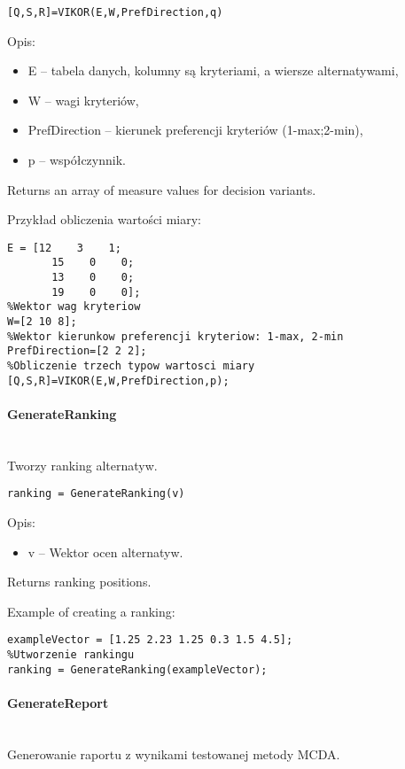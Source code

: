 \begin{lstlisting}[style=Matlab-editor]
[Q,S,R]=VIKOR(E,W,PrefDirection,q)
\end{lstlisting}

Opis:
\begin{itemize}
\item E -- tabela danych, kolumny są kryteriami, a wiersze alternatywami,
\item W -- wagi kryteriów,
\item PrefDirection -- kierunek preferencji kryteriów (1-max;2-min),
\item p -- współczynnik.
\end{itemize}

Returns an array of measure values for decision variants.

Przykład obliczenia wartości miary:
\begin{lstlisting}[style=Matlab-editor]
%Tablica danych
E = [12    3    1;
       15    0    0;
       13    0    0;
       19    0    0];
%Wektor wag kryteriow
W=[2 10 8];
%Wektor kierunkow preferencji kryteriow: 1-max, 2-min
PrefDirection=[2 2 2];
%Obliczenie trzech typow wartosci miary
[Q,S,R]=VIKOR(E,W,PrefDirection,p);
\end{lstlisting}


\paragraph{GenerateRanking} \hspace{0pt} \\
Tworzy ranking alternatyw.

\begin{lstlisting}[style=Matlab-editor]
ranking = GenerateRanking(v)
\end{lstlisting}

Opis:
\begin{itemize}
\item  v -- Wektor ocen alternatyw.
\end{itemize}

Returns ranking positions.

Example of creating a ranking:
\begin{lstlisting}[style=Matlab-editor]
%Przykladowy wektor
exampleVector = [1.25 2.23 1.25 0.3 1.5 4.5];
%Utworzenie rankingu
ranking = GenerateRanking(exampleVector);
\end{lstlisting}

\paragraph{GenerateReport} \hspace{0pt} \\
Generowanie raportu z wynikami testowanej metody MCDA.

